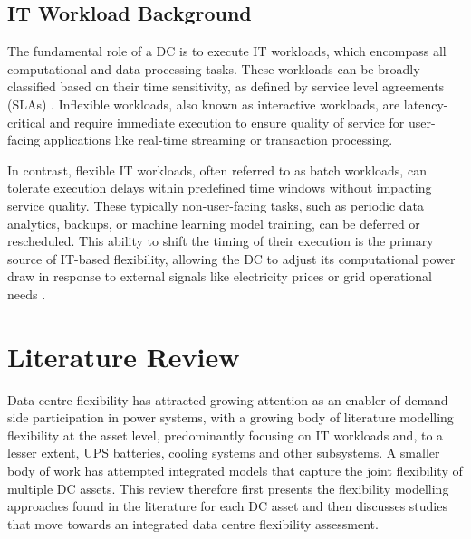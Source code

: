 \documentclass[lettersize,journal]{IEEEtran}
\begin{document}
\subsection{IT Workload Background}
The fundamental role of a DC is to execute IT workloads, which encompass all computational and data processing tasks. These workloads can be broadly classified based on their time sensitivity, as defined by service level agreements (SLAs) \cite{Liu2024Access,Cao2022ApEn}. Inflexible workloads, also known as interactive workloads, are latency-critical and require immediate execution to ensure quality of service for user-facing applications like real-time streaming or transaction processing.

In contrast, flexible IT workloads, often referred to as batch workloads, can tolerate execution delays within predefined time windows without impacting service quality. These typically non-user-facing tasks, such as periodic data analytics, backups, or machine learning model training, can be deferred or rescheduled. This ability to shift the timing of their execution is the primary source of IT-based flexibility, allowing the DC to adjust its computational power draw in response to external signals like electricity prices or grid operational needs \cite{Cao2022ApEn}.

\section{Literature Review}\label{sec:literature}

Data centre flexibility has attracted growing attention as an enabler of demand side participation in power systems, with a growing body of literature modelling flexibility at the asset level, predominantly focusing on IT workloads and, to a lesser extent, UPS batteries, cooling systems and other subsystems. A smaller body of work has attempted integrated models that capture the joint flexibility of multiple DC assets. This review therefore first presents the flexibility modelling approaches found in the literature for each DC asset and then discusses studies that move towards an integrated data centre flexibility assessment.
\end{document}
